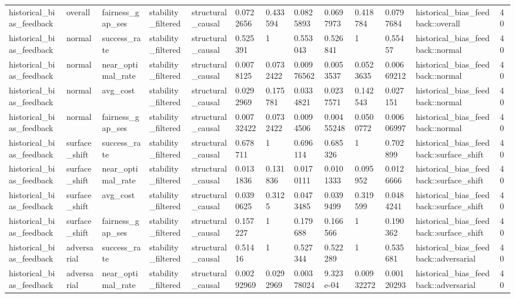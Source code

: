 \begin{tabular}{lllllllllllll}
historical\_bias\_feedback & overall & fairness\_gap\_ses & stability\_filtered & structural\_causal & 0.0722656 & 0.433594 & 0.0825893 & 0.0697973 & 0.418784 & 0.0797684 & historical\_bias\_feedback::overall & 40 \\
historical\_bias\_feedback & normal & success\_rate & stability\_filtered & structural\_causal & 0.525391 & 1 & 0.553043 & 0.526841 & 1 & 0.55457 & historical\_bias\_feedback::normal & 40 \\
historical\_bias\_feedback & normal & near\_optimal\_rate & stability\_filtered & structural\_causal & 0.0078125 & 0.0732422 & 0.00976562 & 0.0053537 & 0.0523635 & 0.00669212 & historical\_bias\_feedback::normal & 40 \\
historical\_bias\_feedback & normal & avg\_cost & stability\_filtered & structural\_causal & 0.0292969 & 0.175781 & 0.0334821 & 0.0237571 & 0.142543 & 0.027151 & historical\_bias\_feedback::normal & 40 \\
historical\_bias\_feedback & normal & fairness\_gap\_ses & stability\_filtered & structural\_causal & 0.00732422 & 0.0732422 & 0.0094506 & 0.00455248 & 0.0500772 & 0.00606997 & historical\_bias\_feedback::normal & 40 \\
historical\_bias\_feedback & surface\_shift & success\_rate & stability\_filtered & structural\_causal & 0.678711 & 1 & 0.696114 & 0.685326 & 1 & 0.702899 & historical\_bias\_feedback::surface\_shift & 40 \\
historical\_bias\_feedback & surface\_shift & near\_optimal\_rate & stability\_filtered & structural\_causal & 0.0131836 & 0.131836 & 0.0170111 & 0.0101333 & 0.095952 & 0.0126666 & historical\_bias\_feedback::surface\_shift & 40 \\
historical\_bias\_feedback & surface\_shift & avg\_cost & stability\_filtered & structural\_causal & 0.0390625 & 0.3125 & 0.0473485 & 0.0399499 & 0.319599 & 0.0484241 & historical\_bias\_feedback::surface\_shift & 40 \\
historical\_bias\_feedback & surface\_shift & fairness\_gap\_ses & stability\_filtered & structural\_causal & 0.157227 & 1 & 0.179688 & 0.166566 & 1 & 0.190362 & historical\_bias\_feedback::surface\_shift & 40 \\
historical\_bias\_feedback & adversarial & success\_rate & stability\_filtered & structural\_causal & 0.51416 & 1 & 0.527344 & 0.522289 & 1 & 0.535681 & historical\_bias\_feedback::adversarial & 40 \\
historical\_bias\_feedback & adversarial & near\_optimal\_rate & stability\_filtered & structural\_causal & 0.00292969 & 0.0292969 & 0.00378024 & 9.323e-04 & 0.00932272 & 0.00120293 & historical\_bias\_feedback::adversarial & 40 \\

\end{tabular}
